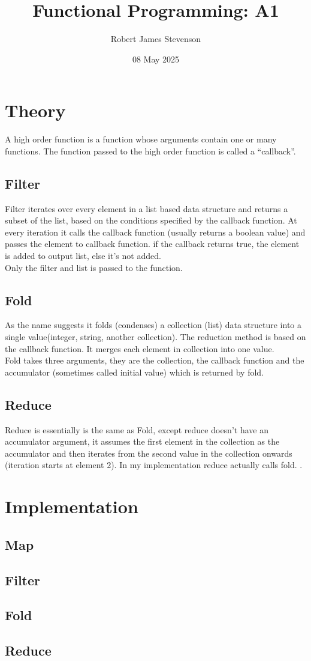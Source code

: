 \documentclass[11pt]{article}
\title{Functional Programming: A1}
\author{Robert James Stevenson}
\date{08 May 2025}
\newcommand{\quotes}[1]{``#1''}
\begin{document}
\maketitle
\section{Theory}
A high order function is a function whose arguments contain one or many functions. The function passed to the high order function is called a \quotes{callback}.
\subsection{Filter}
Filter iterates over every element in a list based data structure and returns a subset of the list, based on the conditions specified by the callback function.
At every iteration it calls the callback function (usually returns a boolean value) and passes the element to callback function. if the callback returns true,
the element is added to output list, else it's not added.
\\
Only the filter and list is passed to the function.
\subsection{Fold}
As the name suggests it folds (condenses) a collection (list) data structure into a single value(integer, string, another collection).
The reduction method is based on the callback function. It merges each element in collection into one value.
\\
Fold takes three arguments, they are the collection, the callback function and the accumulator (sometimes called initial value) which is returned by fold.
\subsection{Reduce}
Reduce is essentially is the same as Fold, except reduce doesn't have an accumulator argument, it assumes the first element in the collection as the 
accumulator and then iterates from the second value in the collection onwards (iteration starts at element 2). In my implementation reduce actually 
calls fold. \autocite{codecamp} \autocite{Philip} \autocite{geeks}.
\section{Implementation}
\subsection{Map}

\subsection{Filter}

\subsection{Fold}

\subsection{Reduce}


\printbibliography
\end{document}
